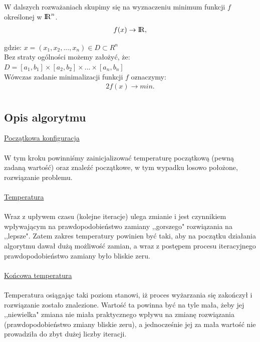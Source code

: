 \documentclass[twoside]{projektInzynierskiMS1}
\newcommand{\newLine}{~\\}
\newcommand{\si}{ś}
\begin{document}
W dalszych rozważaniach skupimy się na wyznaczeniu minimum funkcji $f$ okre\si lonej w ${\rm I\!R}^n$.
\begin{alignat*}{2}
f(x) \rightarrow {\rm I\!R}, 
\end{alignat*}

\noindent gdzie: $x = (x_1, x_2, ..., x_n) \in D \subset R^n$ \\

Bez straty ogólno\si ci możemy założyć, że:\\
$D = [a_1, b_1] \times [ a_2, b_2] \times ... \times [a_n, b_n]$ \\

Wówczas zadanie minimalizacji funkcji $f$ oznaczymy:
\begin{alignat*}{2}
f(x) \rightarrow min. \\
\end{alignat*}


		\subsection{Opis algorytmu}
		
\noindent \underline{Początkowa konfiguracja} \\ \newLine
\indent W tym kroku powinniśmy zainicjalizować temperaturę początkową (pewną zadaną warto\si ć) oraz znaleźć początkowe, w tym wypadku losowo położone, rozwiązanie problemu. 
\\ \newLine

\noindent \underline{Temperatura} \\ \newLine
\indent  Wraz z upływem czasu (kolejne iteracje) ulega zmianie i jest czynnikiem wpływającym na prawdopodobieństwo zamiany ,,gorszego" rozwiązania na ,,lepsze". Zatem zakres temperatury powinien być taki, aby na początku działania algorytmu dawał dużą możliwość zamian, a wraz z postępem procesu iteracyjnego prawdopodobieństwo zamiany było bliskie zeru.\\ \newLine

\noindent \underline{Końcowa temperatura} \\ \newLine
\indent Temperatura osiągając taki poziom stanowi, iż proces wyżarzania się zakończył i rozwiązanie zostało znalezione.
Wartość ta powinna być na tyle mała, żeby jej ,,niewielka" zmiana nie miała praktycznego wpływu na zmianę rozwiązania (prawdopodobieństwo zmiany bliskie zeru), a jednocze\si nie jej za mała warto\si ć nie prowadziła do zbyt dużej liczby iteracji. \\ \newLine
\end{document}
